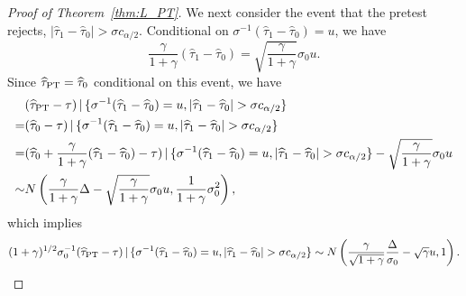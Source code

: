 \documentclass[11pt]{article}
\def\given{\,|\,}
\newcommand{\htau}{\widehat\tau}
\numberwithin{equation}{section}
\theoremstyle{definition}
\begin{document}
\begin{proof}[Proof of Theorem~\ref{thm:L_PT}]
We next consider the event that the pretest rejects, $\lvert \htau_1 - \htau_0 \rvert > \sigma c_{\alpha/2}$. Conditional on $\sigma^{-1}(\htau_1 - \htau_0) = u$, we have
\[
  \frac{\gamma}{1+\gamma} (\htau_1-\htau_0) = \sqrt{\frac{\gamma}{1+\gamma}} \sigma_0 u.
\]
Since $\htau_{\rm PT} = \htau_0$ conditional on this event, we have
\begin{align*}
  &(\htau_{\rm PT} - \tau) \given \{\sigma^{-1}(\htau_1 - \htau_0) = u, \lvert \htau_1 - \htau_0 \rvert > \sigma c_{\alpha/2}\} \\
  =& (\htau_0 - \tau) \given \{\sigma^{-1}(\htau_1 - \htau_0) = u, \lvert \htau_1 - \htau_0 \rvert > \sigma c_{\alpha/2}\}\\
  =& (\htau_0 + \frac{\gamma}{1+\gamma} (\htau_1-\htau_0)-\tau) \given \{\sigma^{-1}(\htau_1 - \htau_0) = u, \lvert \htau_1 - \htau_0 \rvert > \sigma c_{\alpha/2}\} - \sqrt{\frac{\gamma}{1+\gamma}} \sigma_0 u\\
  \sim& N\left(\frac{\gamma}{1+\gamma}\Delta - \sqrt{\frac{\gamma}{1+\gamma}} \sigma_0 u, \frac{1}{1+\gamma} \sigma_0^2\right),
\end{align*}
which implies
\begin{align*}
  (1+\gamma)^{1/2} \sigma_0^{-1} (\htau_{\rm PT} - \tau) \given \{\sigma^{-1}(\htau_1 - \htau_0) = u, \lvert \htau_1 - \htau_0 \rvert > \sigma c_{\alpha/2}\} \sim N\left(\frac{\gamma}{\sqrt{1+\gamma}} \frac{\Delta}{\sigma_0} - \sqrt{\gamma} u, 1\right).
\end{align*}


\end{proof}
\end{document}

